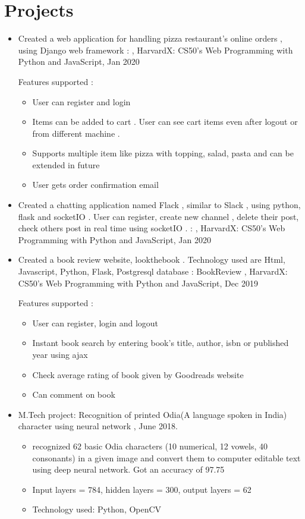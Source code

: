 \documentclass[a4paper,10pt]{article}
\begin{document}
	\section{Projects}
	\begin{itemize}
				
				\item Created a web application for handling pizza restaurant's online orders , using Django web framework : , HarvardX: CS50's Web Programming with Python and JavaScript, Jan 2020
					
					Features supported :
					\begin{itemize}
						\item User can register and login
						\item Items can be added to cart . User can see cart items even after logout or from different machine .
						\item Supports multiple item like pizza with topping, salad, pasta and can be extended in future
						\item User gets order confirmation email
					\end{itemize}
					
				\item Created a chatting application named Flack , similar to Slack , using python, flask and socketIO . User can register, create new channel , delete their post, check others post in real time using socketIO . :  , HarvardX: CS50's Web Programming with Python and JavaScript, Jan 2020
				
				\item Created a book review website, lookthebook . Technology used are Html, Javascript, Python, Flask, Postgresql database : BookReview  , HarvardX: CS50's Web Programming with Python and JavaScript, Dec 2019
				
				Features supported :
				\begin{itemize}
					\item User can register, login and logout
					\item Instant book search by entering book's title, author, isbn or published year using ajax
					\item Check average rating of book given by Goodreads website
					\item Can comment  on book 
				\end{itemize}
				
				\item M.Tech project: Recognition of printed Odia(A language spoken in India) character using neural network , June 2018.
				\begin{itemize}
				    \item recognized 62 basic Odia characters (10 numerical, 12 vowels, 40 consonants) in a given image and convert them to computer editable text using deep neural network. Got an accuracy of 97.75
				    \item Input layers = 784, hidden layers = 300, output layers = 62
				    \item Technology used: Python, OpenCV
				\end{itemize}
				

\end{itemize}
\end{document}
